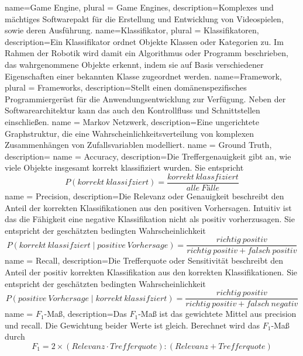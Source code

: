 {
  name=Game Engine,
  plural = {Game Engines},
  description={Komplexes und mächtiges Softwarepakt für die Erstellung und Entwicklung von Videospielen, sowie deren Ausführung.}
}
{
  name=Klassifikator,
  plural = {Klassifikatoren},
  description={Ein Klassifikator ordnet Objekte Klassen oder Kategorien zu. Im Rahmen der Robotik wird damit ein Algorithmus oder Programm beschrieben, das wahrgenommene Objekte erkennt, indem sie auf Basis verschiedener Eigenschaften einer bekannten Klasse zugeordnet werden.}
}
{
  name=Framework,
  plural = {Frameworks},
  description={Stellt einen domänenspezifisches Programmiergerüst für die Anwendungsentwicklung zur Verfügung. Neben der Softwarearchitektur kann das auch den Kontrollfluss und Schnittstellen einschließen.}
}
{
  name = {Markov Netzwerk},
  description={Eine ungerichtete Graphstruktur, die eine Wahrscheinlichkeitsverteilung von komplexen Zusammenhängen von Zufallsvariablen modelliert.}
}
{
  name = {Ground Truth},
  description={\todo{}}
}
{
  name = {Accuracy},
  description={Die Treffergenauigkeit gibt an, wie viele Objekte insgesamt korrekt klassifiziert wurden. Sie entspricht \begin{displaymath}
P(korrekt\ klassifziert) = \frac{korrekt\ klassfiziert}{alle\ Fälle} 
\end{displaymath}}
}
{
  name = {Precision},
  description={Die Relevanz oder Genauigkeit beschreibt den Anteil der korrekten Klassifikationen aus den positiven Vorhersagen. Intuitiv ist das die Fähigkeit eine negative Klassifikation nicht als positiv vorherzusagen. Sie entspricht der geschätzten bedingten Wahrscheinlichkeit \begin{displaymath}
P(korrekt\ klassifziert \mid positive\ Vorhersage) = \frac{richtig\ positiv}{richtig\ positiv + falsch\ positiv}
\end{displaymath}}
}
{
  name = {Recall},
  description={Die Trefferquote oder Sensitivität beschreibt den Anteil der positiv korrekten Klassifikation aus den korrekten Klassifikationen. Sie entspricht der geschätzten bedingten Wahrscheinlichkeit \begin{displaymath}
P(positive\ Vorhersage \mid korrekt\ klassifziert) = \frac{richtig\ positiv}{richtig\ positiv + falsch\ negativ}
\end{displaymath}}
}
{
  name = {$F_1$-Maß},
  description={Das $F_1$-Maß ist das gewichtete Mittel aus \gls{precision} und \gls{recall}. Die Gewichtung beider Werte ist gleich. Berechnet wird das $F_1$-Maß durch
\begin{displaymath}
F_1 = 2 \times (Relevanz \cdot Trefferquote) : (Relevanz + Trefferquote)
\end{displaymath}}
}

